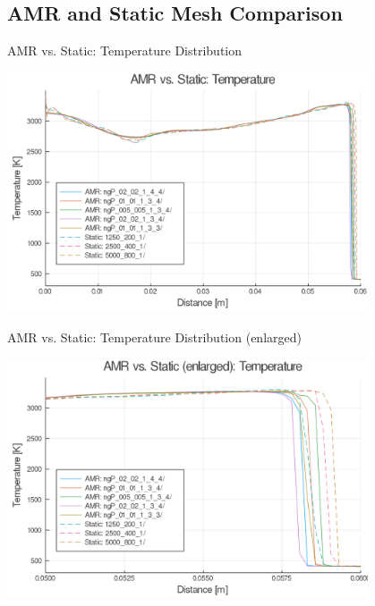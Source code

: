 \subsection{AMR and Static Mesh Comparison}

\begin{frame}{AMR vs. Static: Temperature Distribution}
\begin{center}
\includegraphics[width=0.8\textwidth]{../figs/amrfigs/amrcompare/t.png}
\end{center}
\end{frame}

\begin{frame}{AMR vs. Static: Temperature Distribution (enlarged)}
\begin{center}
\includegraphics[width=0.8\textwidth]{../figs/amrfigs/amrcompare/te.png}
\end{center}
\end{frame}


